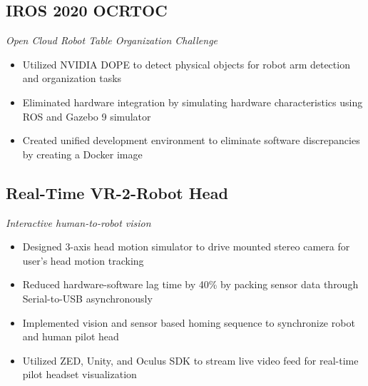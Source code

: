 \documentclass[11pt]{article}
\begin{document}
    \subsection*{IROS 2020 OCRTOC}
    \vspace{-0.2cm}
    \textit{Open Cloud Robot Table Organization Challenge} \vspace {-0.1cm}
    \begin{itemize}[noitemsep]
        \item Utilized NVIDIA DOPE to detect physical objects for robot arm detection and organization tasks
        \item Eliminated hardware integration by simulating hardware characteristics using ROS and
        Gazebo 9 simulator
        \item Created unified development environment to eliminate software discrepancies by creating a
        Docker image
    \end{itemize}
    \subsection*{Real-Time VR-2-Robot Head}
    \vspace{-0.2cm}
    \textit{Interactive human-to-robot vision}
    \vspace{-0.1cm}
    \begin{itemize}[noitemsep]
        \item Designed 3-axis head motion simulator to drive mounted stereo camera for user's head motion tracking
        \item Reduced hardware-software lag time by 40\% by packing sensor data through Serial-to-USB asynchronously
        \item Implemented vision and sensor based homing sequence to synchronize robot and human pilot head
        \item Utilized ZED, Unity, and Oculus SDK to stream live video feed for real-time pilot headset visualization
    \end{itemize} 
\end{document}
